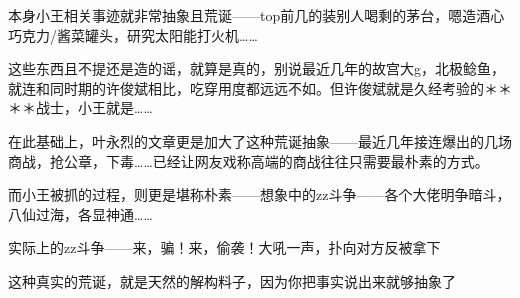 \begin{zhihuanswer}
本身小王相关事迹就非常抽象且荒诞------top前几的装别人喝剩的茅台，嗯造酒心巧克力/酱菜罐头，研究太阳能打火机\ldots\ldots{}

这些东西且不提还是造的谣，就算是真的，别说最近几年的故宫大g，北极鲶鱼，就连和同时期的许俊斌相比，吃穿用度都远远不如。但许俊斌就是久经考验的＊＊＊＊战士，小王就是\ldots\ldots{}

在此基础上，叶永烈的文章更是加大了这种荒诞抽象------最近几年接连爆出的几场商战，抢公章，下毒\ldots\ldots 已经让网友戏称高端的商战往往只需要最朴素的方式。

而小王被抓的过程，则更是堪称朴素------想象中的zz斗争------各个大佬明争暗斗，八仙过海，各显神通\ldots\ldots{}

实际上的zz斗争------来，骗！来，偷袭！大吼一声，扑向对方反被拿下

这种真实的荒诞，就是天然的解构料子，因为你把事实说出来就够抽象了
\end{zhihuanswer}

